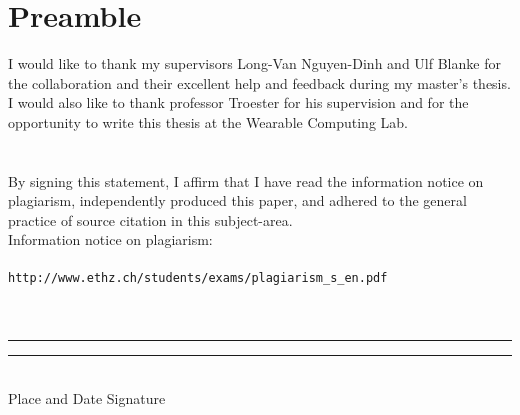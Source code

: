 \chapter*{Preamble}
I would like to thank my supervisors Long-Van Nguyen-Dinh and Ulf Blanke for the collaboration and their excellent help and feedback during my master's thesis.\\
I would also like to thank professor Troester for his supervision and for the opportunity to write this thesis at the Wearable Computing Lab.\\
\\
\\
By signing this statement, I affirm that I have read the information notice on plagiarism, independently produced this paper, and adhered to the general practice of source citation in this subject-area.
\\
Information notice on plagiarism:
\\
\\
\verb"http://www.ethz.ch/students/exams/plagiarism_s_en.pdf"
\\
\\
\\
\begin{tabbing}
\noindent\rule{4cm}{0.4pt} \hspace{1cm} \noindent\rule{5cm}{0.4pt}
\\
Place and Date \hspace{2.5cm}Signature
\end{tabbing} 